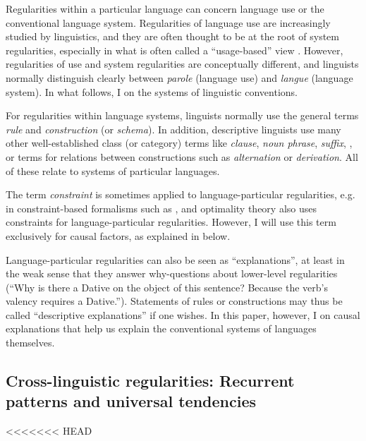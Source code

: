\documentclass[output=paper]{langsci/langscibook}
\begin{document}
Regularities within a particular language can concern language use or the conventional language system. Regularities of language use are increasingly studied by  linguistics, and they are often thought to be at the root of system regularities, especially in what is often called a “usage-based” view \citep{Bybee2010}. However, regularities of use and system regularities are conceptually different, and linguists normally distinguish clearly between \textit{parole} (language use) and \textit{langue} (language system). In what follows, I  on the systems of linguistic conventions.

For regularities within language systems, linguists normally use the general terms \textit{rule} and \textit{construction} (or \textit{schema}). In addition, descriptive linguists use many other well-established class (or category) terms like \textit{clause}, \textit{noun phrase}, \textit{suffix}, \textit{ }, or terms for relations between constructions such as \textit{alternation} or \textit{derivation}. All of these relate to systems of particular languages.

The term \textit{constraint} is sometimes applied to language-particular regularities, e.g. in constraint-based formalisms such as , and optimality theory also uses constraints for language-particular regularities. However, I will use this term exclusively for causal factors, as explained in  below.

Language-particular regularities can also be seen as “explanations”, at least in the weak sense that they answer why-questions about lower-level regularities (“Why is there a Dative  on the object of this sentence? Because the verb’s valency requires a Dative.”). Statements of rules or constructions may thus be called “descriptive explanations” if one wishes. In this paper, however, I  on causal explanations that help us explain the conventional systems of languages themselves.

\subsection{Cross-linguistic regularities: Recurrent patterns and universal tendencies}\label{sec:haspelmath:2.2}

<<<<<<< HEAD
\end{document}
